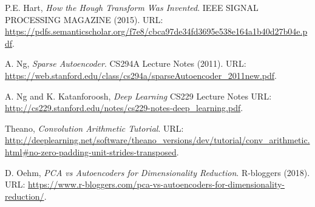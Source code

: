 \begin{thebibliography}{3}
P.E. Hart,
\emph{How the Hough Transform Was Invented}.
IEEE SIGNAL PROCESSING MAGAZINE
(2015).
URL: \url{https://pdfs.semanticscholar.org/f7e8/cbca97de34fd3695e538e164a1b40d27b04e.pdf}.

A. Ng,
\emph{Sparse Autoencoder}.
CS294A Lecture Notes
(2011).
URL: \url{https://web.stanford.edu/class/cs294a/sparseAutoencoder_2011new.pdf}.

A. Ng and K. Katanforoosh,
\emph{Deep Learning}
CS229 Lecture Notes
URL: \url{http://cs229.stanford.edu/notes/cs229-notes-deep_learning.pdf}.

Theano,
\emph{Convolution Arithmetic Tutorial}.
URL: \url{http://deeplearning.net/software/theano_versions/dev/tutorial/conv_arithmetic.html#no-zero-padding-unit-strides-transposed}.

D. Oehm,
\emph{PCA vs Autoencoders for Dimensionality Reduction}.
R-bloggers
(2018).
URL: \url{https://www.r-bloggers.com/pca-vs-autoencoders-for-dimensionality-reduction/}.

\end{thebibliography}
\nonfrenchspacing

